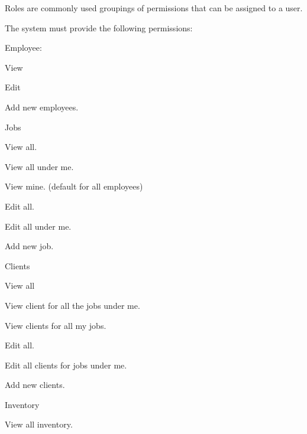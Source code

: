 \documentclass{article}
\begin{document}
	\begin{list}{R.}{}
		\item Roles are commonly used groupings of permissions that can be assigned to a user.
		\item The system must provide the following permissions:
		\begin{list}{R.}{}
			\item Employee:
			\begin{list}{R...}{}
				\item View
				\item Edit
				\item Add new employees.
			\end{list} 
			\item Jobs
			\begin{list}{R...}{}
				\item View all.
				\item View all under me. 
				\item View mine. (default for all employees)
				\item Edit all.
				\item Edit all under me.
				\item Add new job.
			\end{list}
			\item Clients
			\begin{list}{R...}{}
				\item View all
				\item View client for all the jobs under me.
				\item View clients for all my jobs.
				\item Edit all.
				\item Edit all clients for jobs under me.
				\item Add new clients.
			\end{list}
			\item Inventory
			\begin{list}{R...}{}
				\item View all inventory.

\end{list}
\end{list}
\end{list}
\end{document}
